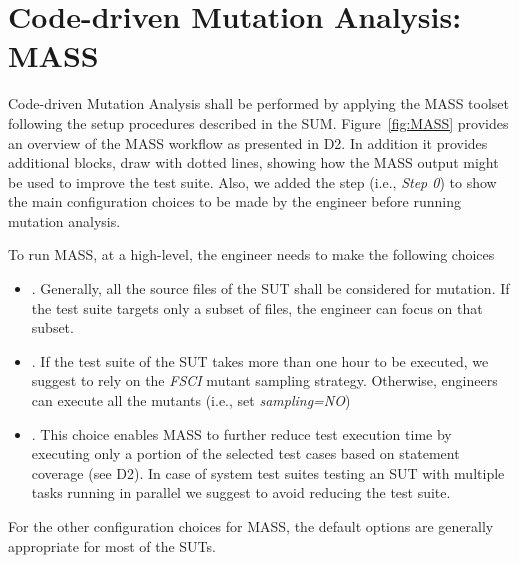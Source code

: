 \section{Code-driven Mutation Analysis: MASS}
\label{sec:meth:mass} 
 
Code-driven Mutation Analysis shall be performed by applying the MASS toolset following the setup procedures described in the SUM. Figure~\ref{fig:MASS} provides an overview of the MASS workflow as presented in D2. In addition it provides additional blocks, draw with dotted lines, showing how the MASS output might be used to improve the test suite. Also, we added the step  (i.e., \emph{Step 0}) to show the main configuration choices to be made by the engineer before running mutation analysis.

To run MASS, at a high-level, the engineer needs to make the following choices
\begin{itemize}
\item {}. Generally, all the source files of the SUT shall be considered for mutation. If the test suite targets only a subset  of files, the engineer can focus on that subset.
\item {}. If the test suite of the SUT takes more than one hour to be executed, we suggest to rely on the \emph{FSCI} mutant sampling strategy. Otherwise, engineers can execute all the mutants (i.e., set \emph{sampling=NO})
\item {}. This choice enables MASS to further reduce test execution time by executing only a portion of the selected test cases based on statement coverage (see D2). In case of system test suites testing an SUT with multiple tasks running in parallel we suggest to avoid reducing the test suite.
\end{itemize}

For the other configuration choices for MASS, the default options are generally appropriate for most of the SUTs.

